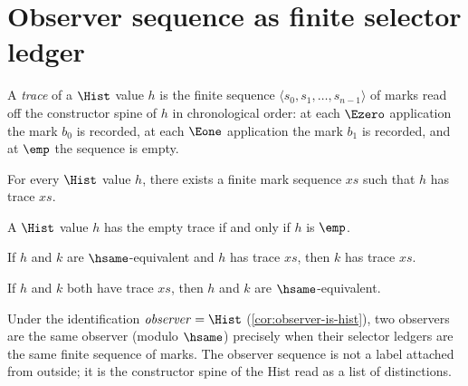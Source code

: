\section{Observer sequence as finite selector ledger}
\label{sec:efm-observer-sequence}

\begin{definition}[Trace]
\label{def:efm-trace}
A \emph{trace} of a $\Hist$ value $h$ is the finite sequence $\langle s_0, s_1, \dots, s_{n-1}\rangle$ of marks read off the constructor spine of $h$ in chronological order: at each $\Ezero$ application the mark $b_0$ is recorded, at each $\Eone$ application the mark $b_1$ is recorded, and at $\emp$ the sequence is empty.
\end{definition}

\begin{theorem}
\label{thm:efm-trace-exists}
For every $\Hist$ value $h$, there exists a finite mark sequence $xs$ such that $h$ has trace $xs$.
\end{theorem}

\begin{theorem}
\label{thm:efm-trace-empty-iff}
A $\Hist$ value $h$ has the empty trace if and only if $h$ is $\emp$.
\end{theorem}

\begin{theorem}
\label{thm:efm-trace-hsame-transport}
If $h$ and $k$ are $\hsame$-equivalent and $h$ has trace $xs$, then $k$ has trace $xs$.
\end{theorem}

\begin{theorem}
\label{thm:efm-trace-determines-hist}
If $h$ and $k$ both have trace $xs$, then $h$ and $k$ are $\hsame$-equivalent.
\end{theorem}

\begin{corollary}
\label{cor:efm-observer-as-sequence}
Under the identification $\mathit{observer} = \Hist$ (\autoref{cor:observer-is-hist}), two observers are the same observer (modulo $\hsame$) precisely when their selector ledgers are the same finite sequence of marks. The observer sequence is not a label attached from outside; it is the constructor spine of the Hist read as a list of distinctions.
\end{corollary}


